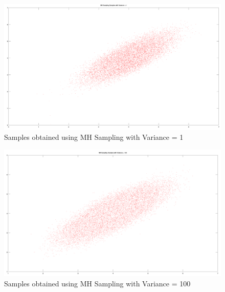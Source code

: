 \documentclass{article}
\begin{document}
\begin{question}
	\begin{figure}[h!]
		\centering
		\includegraphics[width=15cm]{plots/samples2.png}
		\caption{Samples obtained using MH Sampling with Variance = 1}
	\end{figure}

	\begin{figure}[h!]
		\centering
		\includegraphics[width=15cm]{plots/samples3.png}
		\caption{Samples obtained using MH Sampling with Variance = 100}
	\end{figure}
\end{question}

\clearpage
\end{document}
